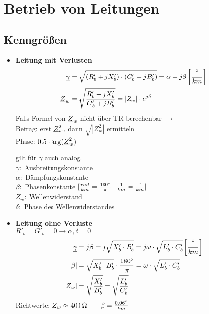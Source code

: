 \section{Betrieb von Leitungen}
\subsection{Kenngrößen}

\begin{itemize}
    \item[] \textbf{Leitung mit Verlusten}
    \begin{align*}
        \underline{\gamma} &= \sqrt{(R'_b +jX'_b)\cdot(G'_b+jB'_b)}= \alpha + j \beta \left[\frac{\degree}{km} \right]\\
        \underline{Z}_w &= \sqrt{\dfrac{R'_b + jX'_b}{G'_b + jB'_b}}= |Z_w| \cdot e^{j\delta}
    \end{align*}
    \indent Falls Formel von $\underline{Z}_w$ nicht über TR berechenbar $\rightarrow$\\
    Betrag: erst $\underline{Z}_w^2$, dann $\sqrt{|Z_w^2|}$ ermitteln \\
    Phase: $0.5 \cdot \arg(\underline{Z}_w^2)$

    gilt für $\gamma$ auch analog.\\

    \indent $\gamma:$ Ausbreitungskonstante\\
    \indent $\alpha:$ Dämpfungskonstante\\
    \indent $\beta:$ Phasenkonstante $[\frac{rad}{km} = \frac{180\degree}{\pi} \cdot \frac{1}{km} = \frac{\degree}{km}]$\\
    \indent $Z_w:$ Wellenwiderstand\\
    \indent $\delta:$ Phase des Wellenwiderstandes\\

    \item[] \textbf{Leitung ohne Verluste}\\
            $R'_b = G'_b = 0\rightarrow \alpha, \delta = 0$
        \begin{align*}
            \underline{\gamma} &= j \beta = j \sqrt{X'_b \cdot B'_b} = j \omega \cdot \sqrt{L'_b \cdot C'_b}\left[\frac{\degree}{km} \right]\\
            |\beta| &= \sqrt{X'_b \cdot B'_b} \cdot \frac{180\degree}{\pi} = \omega \cdot \sqrt{L'_b \cdot C'_b} \\
            |Z_w| &= \sqrt{ \dfrac{X'_b}{B'_b} } = \sqrt{ \dfrac{L'_b}{C'_b} }
        \end{align*}
    Richtwerte:
            $Z_w \approx 400\: \ohm \qquad \beta = \frac{0,06\degree}{km}$\\


\end{itemize}
